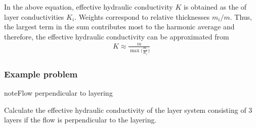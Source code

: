 \documentclass[letterpaper,10pt,english]{sphinxmanual}
\begin{document}
In the above equation, effective hydraulic conductivity \(K\) is obtained as the  of layer conductivities \(K_i\). Weights
correspond to relative thicknesses \(m_i/m\). Thus, the largest term in the sum contributes most to
the harmonic average and therefore, the effective hydraulic conductivity can be approximated from
\begin{equation*}
\begin{split}
K \approx \frac{m}{{\max\big(\frac{m_i}{K_i}}\big)}
\end{split}
\end{equation*}

\subsubsection{Example problem}
\label{\detokenize{contents/flow/lecture_05/15_het_iso:id1}}
\begin{sphinxadmonition}{note}{Flow perpendicular to layering}

Calculate the effective hydraulic conductivity of the layer system consisting of 3 layers if the flow is perpendicular to the layering.
\end{sphinxadmonition}
\end{document}
